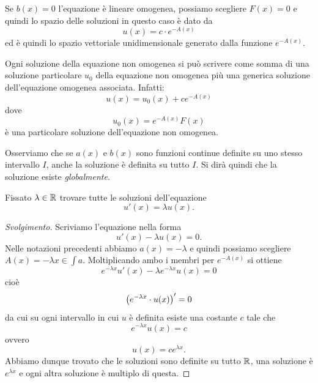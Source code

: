 Se $b(x)=0$ l'equazione è lineare omogenea, possiamo scegliere $F(x) = 0$
e quindi lo spazio delle soluzioni in questo caso
è dato da
\[
  u(x) = c \cdot e^{-A(x)}
\]
ed è quindi lo spazio vettoriale unidimensionale generato dalla funzione $e^{-A(x)}$.

Ogni soluzione della equazione non omogenea si può scrivere come somma di una
soluzione particolare $u_0$ della equazione non omogenea
più una generica soluzione dell'equazione omogenea associata. Infatti:
\[
  u(x) = u_0(x) + c e^{-A(x)}
\]
dove
\[
  u_0(x) = e^{-A(x)}F(x)
\]
è una particolare soluzione dell'equazione non omogenea.

Osserviamo che se $a(x)$ e $b(x)$ sono funzioni continue definite su uno stesso
intervallo $I$, anche la soluzione è definita su tutto $I$.
Si dirà quindi che la soluzione esiste \emph{globalmente}.

\begin{exercise}%
  \label{ex:58230978}
Fissato $\lambda \in {\mathbb R}$ trovare tutte le soluzioni dell'equazione
\[
  u'(x) = \lambda u(x).
\]
\end{exercise}
%
\begin{proof}[Svolgimento]
Scriviamo l'equazione nella forma
\[
  u'(x) - \lambda u(x) = 0.
\]
Nelle notazioni precedenti abbiamo $a(x) = -\lambda$ e quindi possiamo scegliere $A(x) = -\lambda x \in \int a$.
Moltiplicando ambo i membri per $e^{-A(x)}$ si ottiene
\[
  e^{-\lambda x} u'(x) - \lambda e^{-\lambda x} u(x) = 0
\]
cioè
\[
 {\left( e^{-\lambda x}\cdot u(x) \right)}' = 0
\]
da cui su ogni intervallo in cui $u$ è definita esiste una costante $c$ tale che
\[
  e^{-\lambda x} u(x) = c
\]
ovvero
\[
  u(x) = c e^{\lambda x}.
\]
Abbiamo dunque trovato che le soluzioni sono definite su tutto ${\mathbb R}$, una soluzione è $e^{\lambda x}$ e ogni altra soluzione è multiplo di questa.
\end{proof}

